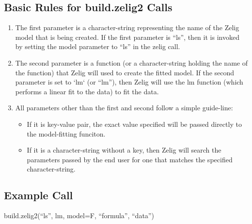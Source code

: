 \documentclass[a4paper, 11pt]{article}
\begin{document}
\subsection{Basic Rules for build.zelig2 Calls}
\begin{enumerate}
	\item{The first parameter is a character-string representing the name of the Zelig model that is being created.  If the first parameter is ``ls'', then it is invoked by setting the model parameter to ``ls'' in the zelig call.}
	\item{The second parameter is a function (or a character-string holding the name of the function) that Zelig will used to create the fitted model.  If the second parameter is set to `lm` (or ``lm''), then Zelig will use the lm function (which performs a linear fit to the data) to fit the data.}
	\item{All parameters other than the first and second follow a simple guide-line:
	\begin{itemize}
		\item{If it is key-value pair, the exact value specified will be passed directly to the model-fitting funciton.}
		\item{If it is a character-string without a key, then Zelig will search the parameters passed by the end user for one that matches the specified character-string.}
	\end{itemize}
	}
\end{enumerate}


\subsection{Example Call}
build.zelig2(``ls'', lm, model=F, ``formula'', ``data'')
\end{document}
